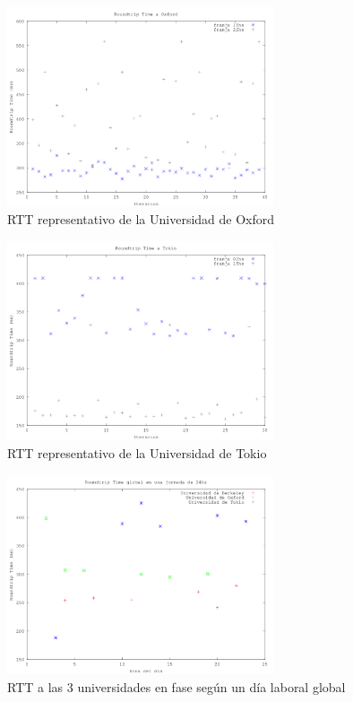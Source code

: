 \begin{figure}[h!]
  \centering
  \includegraphics[width=0.7\textwidth]{./figs/rtt_horarios_oxford.png}
  \caption{RTT representativo de la Universidad de Oxford}
  \label{fig:rtt-horarios-oxford}
\end{figure}

\begin{figure}[h!]
  \centering
  \includegraphics[width=0.7\textwidth]{./figs/rtt_horarios_tokyo.png}
  \caption{RTT representativo de la Universidad de Tokio}
  \label{fig:rtt-horarios-tokyo}
\end{figure}

\clearpage

\begin{figure}[t!]
  \centering
  \includegraphics[width=0.7\textwidth]{./figs/rtt_normalizado.png}
  \caption{RTT a las 3 universidades en fase según un día laboral global}
  \label{fig:rtt-normalizado}
\end{figure}

